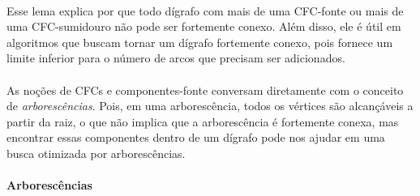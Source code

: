 \documentclass[12pt,a4paper]{article}
\begin{document}
\paragraph{}
Esse lema explica por que todo dígrafo com mais de uma CFC-fonte ou mais de uma CFC-sumidouro não pode ser fortemente conexo. Além disso, ele é útil em algoritmos que buscam tornar um dígrafo fortemente conexo, pois fornece um limite inferior para o número de arcos que precisam ser adicionados.

\paragraph{}
As noções de CFCs e componentes-fonte conversam diretamente com o conceito de \emph{arborescências}. Pois, em uma arborescência, todos os vértices são alcançáveis a partir da raiz, o que não implica que a arborescência é fortemente conexa, mas encontrar essas componentes dentro de um dígrafo pode nos ajudar em uma busca otimizada por arborescências.

\paragraph{Arborescências}
\end{document}
